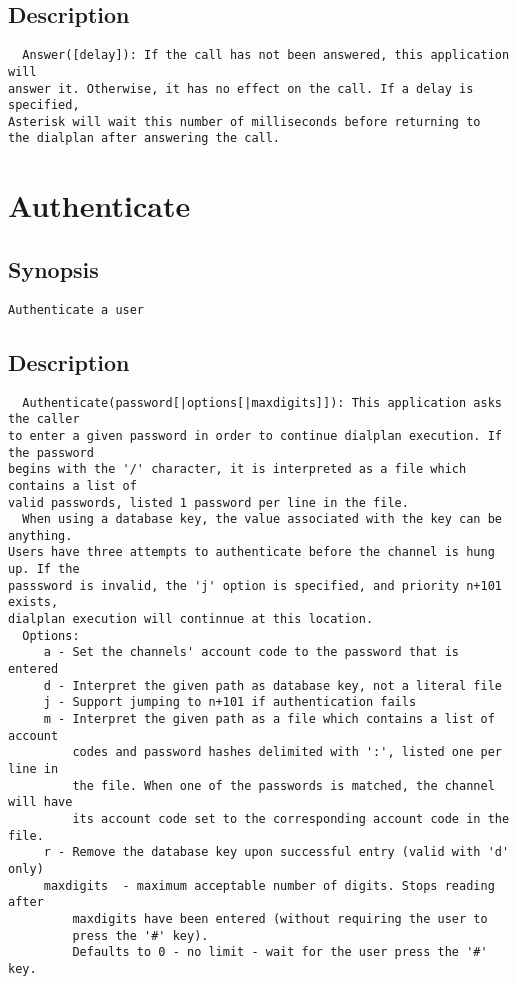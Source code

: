 \subsection{Description}
\begin{verbatim}
  Answer([delay]): If the call has not been answered, this application will
answer it. Otherwise, it has no effect on the call. If a delay is specified,
Asterisk will wait this number of milliseconds before returning to
the dialplan after answering the call.

\end{verbatim}


\section{Authenticate}
\subsection{Synopsis}
\begin{verbatim}
Authenticate a user
\end{verbatim}
\subsection{Description}
\begin{verbatim}
  Authenticate(password[|options[|maxdigits]]): This application asks the caller
to enter a given password in order to continue dialplan execution. If the password
begins with the '/' character, it is interpreted as a file which contains a list of
valid passwords, listed 1 password per line in the file.
  When using a database key, the value associated with the key can be anything.
Users have three attempts to authenticate before the channel is hung up. If the
passsword is invalid, the 'j' option is specified, and priority n+101 exists,
dialplan execution will continnue at this location.
  Options:
     a - Set the channels' account code to the password that is entered
     d - Interpret the given path as database key, not a literal file
     j - Support jumping to n+101 if authentication fails
     m - Interpret the given path as a file which contains a list of account
         codes and password hashes delimited with ':', listed one per line in
         the file. When one of the passwords is matched, the channel will have
         its account code set to the corresponding account code in the file.
     r - Remove the database key upon successful entry (valid with 'd' only)
     maxdigits  - maximum acceptable number of digits. Stops reading after
         maxdigits have been entered (without requiring the user to
         press the '#' key).
         Defaults to 0 - no limit - wait for the user press the '#' key.

\end{verbatim}


